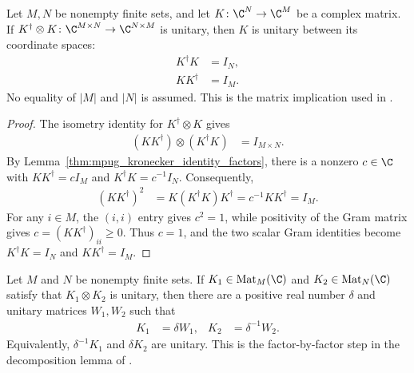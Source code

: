 \begin{lemma}
    \label{thm:matrix_unitary_adjoint_kronecker}
    \leanok
    Let $M,N$ be nonempty finite sets, and let
    $K\colon\C^N\to\C^M$ be a complex matrix. If
    $K^\dagger\otimes K\colon\C^{M\times N}\to\C^{N\times M}$
    is unitary, then $K$ is unitary between its coordinate spaces:
    \begin{align}
        K^\dagger K & =I_N, \\
        KK^\dagger  & =I_M.
    \end{align}
    No equality of $|M|$ and $|N|$ is assumed. This is the matrix implication
    used in \cite[lines~5444--5487]{FrancoRubio2025MPUGauging}.
\end{lemma}

\begin{proof}\leanok
    The isometry identity for $K^\dagger\otimes K$ gives
    \begin{align}
        (KK^\dagger)\otimes(K^\dagger K) & =I_{M\times N}.
    \end{align}
    By Lemma~\ref{thm:mpug_kronecker_identity_factors}, there is a
    nonzero $c\in\C$ with $KK^\dagger=cI_M$ and
    $K^\dagger K=c^{-1}I_N$. Consequently,
    \begin{align}
        (KK^\dagger)^2
         & =K(K^\dagger K)K^\dagger
        =c^{-1}KK^\dagger=I_M.
    \end{align}
    For any $i\in M$, the $(i,i)$ entry gives $c^2=1$, while positivity
    of the Gram matrix gives $c=(KK^\dagger)_{ii}\geq0$.
    Thus $c=1$, and the two scalar Gram identities become
    $K^\dagger K=I_N$ and $KK^\dagger=I_M$.
\end{proof}

\begin{lemma}
    \label{thm:mpug_unitary_kronecker_factors}
    \leanok
    Let $M$ and $N$ be nonempty finite sets. If
    $K_1\in\operatorname{Mat}_M(\C)$ and
    $K_2\in\operatorname{Mat}_N(\C)$ satisfy that $K_1\otimes K_2$ is
    unitary, then there are a positive real number $\delta$ and unitary
    matrices $W_1,W_2$ such that
    \begin{align}
        K_1 & =\delta W_1, & K_2 & =\delta^{-1}W_2.
        \label{eq:mpug_unitary_kronecker_factors}
    \end{align}
    Equivalently, $\delta^{-1}K_1$ and $\delta K_2$ are unitary. This is the
    factor-by-factor step in the decomposition lemma of
    \cite[lines~1052--1066]{FrancoRubio2025MPUGauging}.
\end{lemma}

